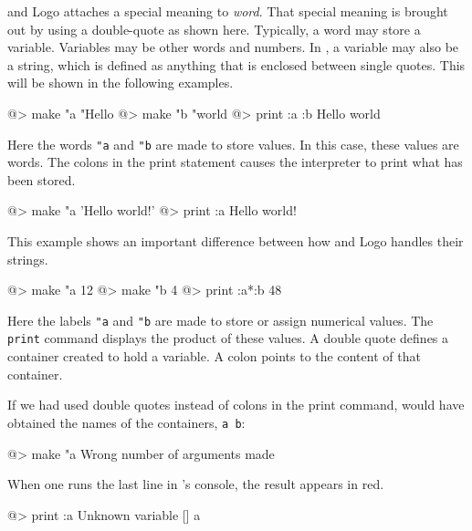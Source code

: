 \squirrel and Logo attaches a special meaning to {\it word}.  That special meaning is brought out by using a double-quote as shown here.  Typically, a word may store a variable.  Variables may be other words and numbers.  In \squirrel, a variable may also be a string, which is defined as anything that is enclosed between single quotes.  This will be shown in the following examples.   

\begin{verbatimtab}
@> make "a "Hello
@> make "b "world
@> print :a :b
Hello world
\end{verbatimtab}

Here the words \verb+"a+ and \verb+"b+ are made to store values.  In this case, these values are words.  The colons in the print statement causes the interpreter to print what has been stored.\\
 
\begin{verbatimtab}
@> make "a 'Hello world!'
@> print :a
Hello world!
\end{verbatimtab}

This example shows an important difference between how \squirrel and Logo handles their strings.
 
\begin{verbatimtab}
@> make "a 12
@> make "b 4
@> print :a*:b
48
\end{verbatimtab}
 
Here the labels \verb+"a+ and \verb+"b+ are made to store or assign numerical values.  The \verb+print+ command displays the product of these values.  A double quote defines a container created to hold a variable.  A colon points to the content of that container.  
 
If we had used double quotes instead of colons in the print command, would have obtained the names of the containers, \verb+a b+:\\

\begin{verbatimtab}
@> make "a
Wrong number of arguments made
\end{verbatimtab}

When one runs the last line in \squirrel 's console, the result appears in red.\\

\begin{verbatimtab}
@> print :a 
Unknown variable [] a
\end{verbatimtab}
 
